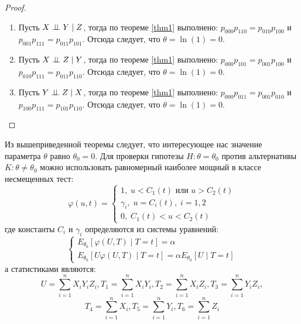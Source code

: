 \begin{proof}
    \begin{enumerate}
        \item Пусть $X \perp\!\!\!\perp Y \mid Z$, тогда по теореме \ref{thm1} выполнено:
        $p_{000}p_{110}=p_{010}p_{100}$ и  $p_{001}p_{111}=p_{011}p_{101}$. Отсюда следует, что
        $\theta=\ln(1)=0$.
        \item Пусть $X \perp\!\!\!\perp Z \mid Y$, тогда по теореме \ref{thm1} выполнено:
        $p_{000}p_{101}=p_{001}p_{100}$ и $p_{010}p_{111}=p_{011}p_{110}$. Отсюда следует, что
        $\theta=\ln(1)=0$.
        \item Пусть $Y \perp\!\!\!\perp Z \mid X$, тогда по теореме \ref{thm1} выполнено:
        $p_{000}p_{011}=p_{001}p_{010}$ и $p_{100}p_{111}=p_{101}p_{110}$. Отсюда следует, что
        $\theta=\ln(1)=0$.
    \end{enumerate}
\end{proof}
Из вышеприведенной теоремы следует, что интересующее нас значение параметра $\theta$ равно $\theta_0=0$.
Для проверки гипотезы $H: \theta = \theta_0$ против альтернативы $K: \theta \neq \theta_0$ можно использовать 
равномерный наиболее мощный в классе несмещенных тест:
$$
\varphi(u,t)=\begin{cases}
    1, \; u<C_1(t) \text{ или } u>C_2(t)\\
    \gamma_i, \; u=C_i(t), \; i=1,2\\
    0, \; C_1(t)<u<C_2(t)
\end{cases}
$$
где константы $C_i$ и $\gamma_i$ определяются из системы уравнений:
$$
\begin{cases}
    E_{\theta_0}[\varphi(U,T) \mid T=t]=\alpha \\
    E_{\theta_0}[U\varphi(U,T) \mid T=t]=\alpha E_{\theta_0}[U \mid T=t]
\end{cases}
$$
а статистиками являются:
$$
    U = \sum_{i=1}^n X_i Y_i Z_i,
    T_1 = \sum_{i=1}^n X_i Y_i,
    T_2 = \sum_{i=1}^n X_i Z_i,
    T_3 = \sum_{i=1}^n Y_i Z_i,
$$
$$
    T_4 = \sum_{i=1}^n X_i,
    T_5 = \sum_{i=1}^n Y_i,
    T_6 = \sum_{i=1}^n Z_i
$$

